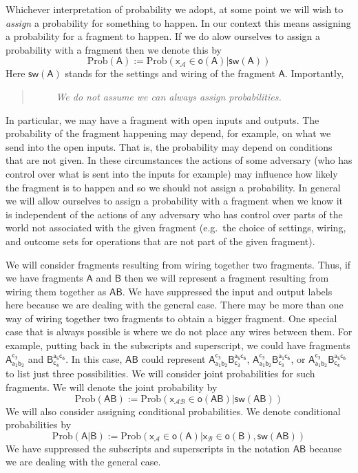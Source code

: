 \documentclass[10pt]{article}
\begin{document}
Whichever interpretation of probability we adopt, at some point we will wish to \emph{assign} a probability for something to happen.  In our context this means assigning a probability for a fragment to happen.  If we do alow ourselves to assign a probability with a fragment then we denote this by
\begin{equation}
\text{Prob}(\mathsf{A}) :=\text{Prob}(\mathsf{x}_\mathcal{A}\in\mathsf{o(A)}|\mathsf{sw(A)})
\end{equation}
Here $\mathsf{sw(A)}$ stands for the settings and wiring of the fragment $\mathsf{A}$.
Importantly,
\begin{quote}
\emph{~~~~ We do not assume we can always assign probabilities. }
\end{quote}
In particular, we may have a fragment with open inputs and outputs.  The probability of the fragment happening may depend, for example, on what we send into the open inputs.  That is, the probability may depend on conditions that are not given.  In these circumstances the actions of some adversary (who has control over what is sent into the inputs for example) may influence how likely the fragment is to happen and so we should not assign a probability.  In general we will allow ourselves to assign a probability with a fragment when we know it is independent of the actions of any adversary who has control over parts of the world not associated with the given fragment (e.g.\ the choice of settings, wiring, and outcome sets for operations that are not part of the given fragment).

We will consider fragments resulting from wiring together two fragments.  Thus, if we have fragments $\mathsf{A}$ and $\mathsf{B}$ then we will represent a fragment resulting from wiring them together as $\mathsf{AB}$.   We have suppressed the input and output labels here because we are dealing with the general case.  There may be more than one way of wiring together two fragments to obtain a bigger fragment. One special case that is always possible is where we do not place any wires between them.   For example, putting back in the subscripts and superscript, we could have fragments $\mathsf{A_{a_1b_2}^{c_3}}$ and $\mathsf{B_{c_4}^{a_5c_6}}$.  In this case, $\mathsf{AB}$ could represent $\mathsf{A_{a_1b_2}^{c_3}} \mathsf{B_{c_3}^{a_5c_6}}$, $\mathsf{A_{a_1b_2}^{c_3}} \mathsf{B_{c_3}^{a_1c_6}}$, or $\mathsf{A_{a_1b_2}^{c_3}} \mathsf{B_{c_4}^{a_5c_6}}$ to list just three possibilities.  We will consider joint probabilities for such fragments.  We will denote the joint probability by
\begin{equation}
\text{Prob}(\mathsf{AB}) :=\text{Prob}(\mathsf{x_\mathcal{AB}\in o(AB)|sw(AB)})
\end{equation}
We will also consider assigning conditional probabilities.  We denote conditional probabilities by
\begin{equation}
\text{Prob}(\mathsf{A|B}) :=\text{Prob}(\mathsf{x_\mathcal{A}\in o(A)|x_\mathcal{B}\in o(B), sw(AB)})
\end{equation}
We have suppressed the subscripts and superscripts in the notation $\mathsf{AB}$ because we are dealing with the general case.
\end{document}
